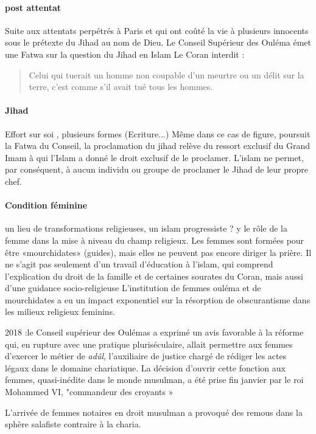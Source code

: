   \paragraph{post attentat} Suite aux attentats perpétrés à Paris et qui ont coûté la vie à plusieurs innocents sous le prétexte du Jihad au nom de Dieu.
  Le Conseil Supérieur des Ouléma émet une Fatwa sur la question du 
  Jihad en Islam
Le Coran interdit : \begin{quote}
    Celui qui tuerait un homme non coupable d'un meurtre ou un délit sur la terre, c'est comme s'il avait tué tous les hommes.
\end{quote}

\paragraph{Jihad} Effort sur soi , plusieurs formes (Ecriture...)
  Même dans ce cas de figure, poursuit la Fatwa du Conseil, la proclamation du jihad relève du ressort exclusif du Grand Imam à qui l'Islam a donné le droit exclusif de le proclamer. L'islam ne permet, par conséquent, à aucun individu ou groupe de proclamer le Jihad de leur propre chef.

\paragraph{Condition féminine}
 un lieu de transformations religieuses, un islam progressiste ?
y le rôle de la femme dans la mise à niveau du champ religieux.
  Les femmes sont formées pour être «mourchidates» (guides), mais elles ne peuvent pas encore diriger la prière.
  Il ne s'agit pas seulement d'un travail d'éducation à l'islam, qui comprend l'explication du droit de la famille et de certaines sourates du Coran, mais aussi d'une guidance socio-religieuse   L'institution de femmes ouléma et de mourchidates a eu un impact exponentiel sur la résorption de obscurantisme dans les milieux religieux feminins.

  2018 :le Conseil supérieur des Oulémas a exprimé un avis favorable à la réforme qui, en rupture avec une pratique pluriséculaire, allait permettre aux femmes d'exercer le métier de \textit{adûl}, l'auxiliaire de justice chargé de rédiger les actes légaux dans le domaine chariatique.
  La décision d'ouvrir cette fonction aux femmes, quasi-inédite dans le monde musulman, a été prise fin janvier par le roi Mohammed VI, "commandeur des croyants » 
  
  
  L'arrivée de femmes notaires en droit musulman a provoqué des remous dans la sphère salafiste contraire à la charia.

